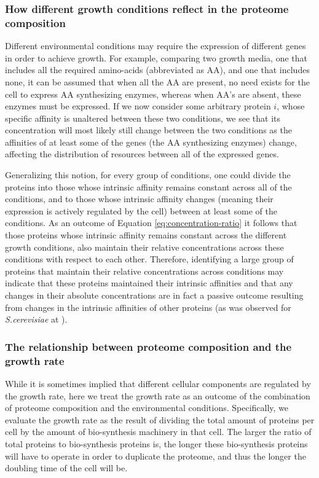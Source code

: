 \documentclass[notitlepage]{article}
\begin{document}
\subsubsection{How different growth conditions reflect in the proteome composition}
Different environmental conditions may require the expression of different genes in order to achieve growth.
For example, comparing two growth media, one that includes all the required amino-acids (abbreviated as AA), and one that includes none, it can be assumed that when all the AA are present, no need exists for the cell to express AA synthesizing enzymes, whereas when AA's are absent, these enzymes must be expressed.
If we now consider some arbitrary protein $i$, whose specific affinity is unaltered between these two conditions, we see that its concentration will most likely still change between the two conditions as the affinities of at least some of the genes (the AA synthesizing enzymes) change, affecting the distribution of resources between all of the expressed genes.

Generalizing this notion, for every group of conditions, one could divide the proteins into those whose intrinsic affinity remains constant across all of the conditions, and to those whose intrinsic affinity changes (meaning their expression is actively regulated by the cell) between at least some of the conditions.
As an outcome of Equation \ref{eq:concentration-ratio} it follows that those proteins whose intrinsic affinity remains constant across the different growth conditions, also maintain their relative concentrations across these conditions with respect to each other.
Therefore, identifying a large group of proteins that maintain their relative concentrations across conditions may indicate that these proteins maintained their intrinsic affinities and that any changes in their absolute concentrations are in fact a passive outcome resulting from changes in the intrinsic affinities of other proteins (as was observed for \emph{S.cerevisiae} at \parencite{Keren2013a}).

\subsubsection{The relationship between proteome composition and the growth rate}
While it is sometimes implied that different cellular components are regulated by the growth rate, here we treat the growth rate as an outcome of the combination of proteome composition and the environmental conditions.
Specifically, we evaluate the growth rate as the result of dividing the total amount of proteins per cell by the amount of bio-synthesis machinery in that cell.
The larger the ratio of total proteins to bio-synthesis proteins is, the longer these bio-synthesis proteins will have to operate in order to duplicate the proteome, and thus the longer the doubling time of the cell will be.
\end{document}
